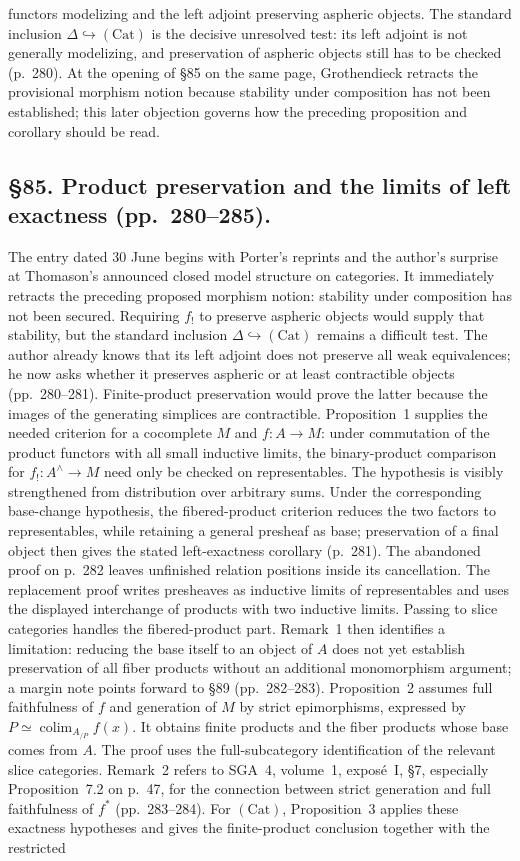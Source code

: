 \documentclass[10pt,oneside]{book}
\begin{document}
functors modelizing and the left adjoint preserving aspheric objects. The standard inclusion $\Delta\hookrightarrow(\mathrm{Cat})$ is the decisive unresolved test: its left adjoint is not generally modelizing, and preservation of aspheric objects still has to be checked (p.\ 280). At the opening of \S85 on the same page, Grothendieck retracts the provisional morphism notion because stability under composition has not been established; this later objection governs how the preceding proposition and corollary should be read.

\subsection*{\S85. Product preservation and the limits of left exactness (pp.\ 280--285).}
The entry dated 30 June begins with Porter's reprints and the author's surprise at Thomason's announced closed model structure on categories. It immediately retracts the preceding proposed morphism notion: stability under composition has not been secured. Requiring $f_!$ to preserve aspheric objects would supply that stability, but the standard inclusion $\Delta\hookrightarrow(\mathrm{Cat})$ remains a difficult test. The author already knows that its left adjoint does not preserve all weak equivalences; he now asks whether it preserves aspheric or at least contractible objects (pp.\ 280--281). Finite-product preservation would prove the latter because the images of the generating simplices are contractible. Proposition~1 supplies the needed criterion for a cocomplete $M$ and $f:A\to M$: under commutation of the product functors with all small inductive limits, the binary-product comparison for $f_!:A^\wedge\to M$ need only be checked on representables. The hypothesis is visibly strengthened from distribution over arbitrary sums. Under the corresponding base-change hypothesis, the fibered-product criterion reduces the two factors to representables, while retaining a general presheaf as base; preservation of a final object then gives the stated left-exactness corollary (p.\ 281). The abandoned proof on p.\ 282 leaves unfinished relation positions inside its cancellation. The replacement proof writes presheaves as inductive limits of representables and uses the displayed interchange of products with two inductive limits. Passing to slice categories handles the fibered-product part. Remark~1 then identifies a limitation: reducing the base itself to an object of $A$ does not yet establish preservation of all fiber products without an additional monomorphism argument; a margin note points forward to \S89 (pp.\ 282--283). Proposition~2 assumes full faithfulness of $f$ and generation of $M$ by strict epimorphisms, expressed by $P\simeq\mathop{\mathrm{colim}}_{A_{/P}}f(x)$. It obtains finite products and the fiber products whose base comes from $A$. The proof uses the full-subcategory identification of the relevant slice categories. Remark~2 refers to SGA~4, volume~1, expos\'e~I, \S7, especially Proposition~7.2 on p.\ 47, for the connection between strict generation and full faithfulness of $f^*$ (pp.\ 283--284). For $(\mathrm{Cat})$, Proposition~3 applies these exactness hypotheses and gives the finite-product conclusion together with the restricted 
\end{document}
